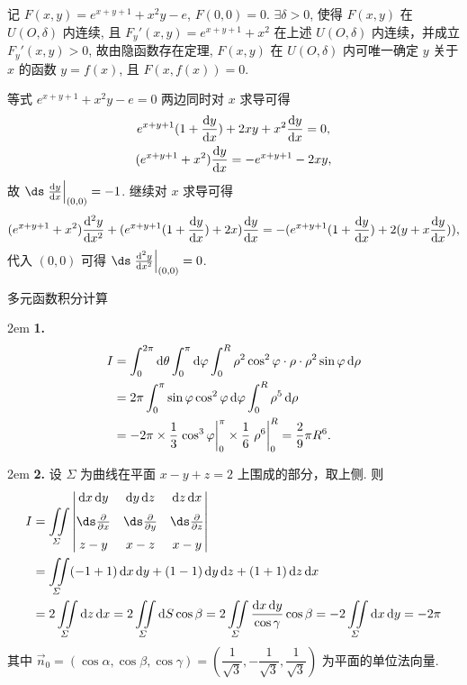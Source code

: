 \documentclass[UTF8,14pt,normal]{ctexart}
\begin{document}
    记 \(F(x, y) = e^{x + y + 1} + x^2y - e\), \(F(0, 0) = 0\). \(\exists \delta > 0\), 使得 \(F(x, y)\) 在 \(U(O, \delta)\) 内连续, 且 \(F_y'(x, y) = e^{x + y + 1} + x^2\) 在上述 \(U(O, \delta)\) 内连续，并成立 \(F_y'(x, y) > 0\), 故由隐函数存在定理, \(F(x, y)\) 在 \(U(O, \delta)\) 内可唯一确定 \(y\) 关于 \(x\) 的函数 \(y = f(x)\), 且 \(F(x, f(x)) = 0\).

    等式 \(e^{x + y + 1} + x^2y - e = 0\) 两边同时对 \(x\) 求导可得
    \begin{gather*}
        e^{x + y + 1} (1 + \dv{y}{x}) + 2xy + x^2 \dv{y}{x} = 0, \\
        (e^{x + y + 1} + x^2) \dv{y}{x} = -e^{x + y + 1} - 2xy, \\
    \end{gather*}
    故 \(\ds \eval{\dv{y}{x}}_{(0, 0)} = -1\).
    继续对 \(x\) 求导可得
    \[
        (e^{x + y + 1} + x^2) \dv[2]{y}{x} + (e^{x + y + 1} (1 + \dv{y}{x}) + 2x) \dv{y}{x} = -(e^{x + y + 1}(1 + \dv{y}{x}) + 2(y + x\dv{y}{x})),
    \]
    代入 \((0, 0)\) 可得 \(\ds \eval{\dv[2]{y}{x}}_{(0, 0)} = 0\).

 多元函数积分计算

    \hangindent 2em
    \noindent
    \textbf{1.}
    \begin{align*}
        I & = \int_{0}^{2\pi} \dd{\theta} \int_{0}^{\pi} \dd{\varphi} \int_{0}^{R} \rho^2 \cos^2 \varphi \cdot \rho \cdot \rho^2 \sin \varphi \dd{\rho} \\
        & = 2\pi \int_{0}^{\pi} \sin \varphi \cos^2 \varphi \dd{\varphi} \int_{0}^{R} \rho^5 \dd{\rho} \\
        & = -2\pi \times \dfrac{1}{3} \eval{\cos^3 \varphi}_{0}^{\pi} \times \dfrac{1}{6} \eval{\rho^6}_{0}^{R} = \dfrac{2}{9} \pi R^6.
    \end{align*}

    \hangindent 2em
    \noindent
    \textbf{2.}
    设 \(\varSigma\) 为曲线在平面 \(x - y + z = 2\) 上围成的部分，取上侧. 则
    \begin{align*}
        I & = \iint\limits_\varSigma \begin{vmatrix}
            \dd{x} \dd{y} & \dd{y} \dd{z} & \dd{z} \dd{x} \\[1.5ex]
            \ds\pdv{x} & \ds\pdv{y} & \ds\pdv{z} \\[1.5ex]
            z - y & x - z & x - y
        \end{vmatrix} \\
        & = \iint\limits_\varSigma (-1 + 1) \dd{x} \dd{y} + (1 - 1) \dd{y} \dd{z} + (1 + 1) \dd{z} \dd{x} \\ & = 2 \iint\limits_\varSigma \dd{z} \dd{x} = 2 \iint\limits_\varSigma \dd{S} \cos \beta = 2 \iint\limits_\varSigma \dfrac{\dd{x} \dd{y}}{\cos \gamma} \cos \beta = -2 \iint\limits_\varSigma \dd{x} \dd{y} = -2\pi
    \end{align*}
    其中 \(\vec{n}_0 = (\cos \alpha, \cos \beta, \cos \gamma) = (\dfrac{1}{\sqrt{3}}, -\dfrac{1}{\sqrt{3}}, \dfrac{1}{\sqrt{3}})\) 为平面的单位法向量.
\end{document}
